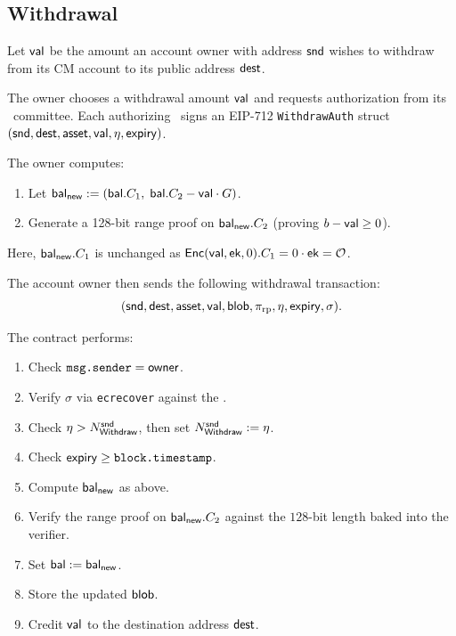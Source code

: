 \subsection{Withdrawal}
\label{sec:withdraw}
%
Let $\mathsf{val}$ be the amount an account owner with address ${\sf snd}$ wishes to withdraw from its CM account to its public address $\mathsf{dest}$.

\one
{}
The owner chooses a withdrawal amount $\mathsf{val}$ and requests authorization from its \CE\ committee.
Each authorizing \CE\ signs an EIP-712 \texttt{WithdrawAuth} struct $({\sf snd}, \mathsf{dest}, \mathsf{asset}, \mathsf{val}, \eta, \mathsf{expiry})$.

\one
{}
The owner computes:
%
\begin{enumerate}[itemsep=.5pt]
    \item Let $\mathsf{bal}_{\mathsf{new}} := (\mathsf{bal}.C_1,\; \mathsf{bal}.C_2 - \mathsf{val} \cdot G)$.
    \item Generate a 128-bit range proof on $\mathsf{bal}_{\mathsf{new}}.C_2$ (proving $b - \mathsf{val}\ge 0$).
\end{enumerate}
%
Here, $\mathsf{bal}_{\mathsf{new}}.C_1$ is unchanged  as ${\mathsf{Enc}}(\mathsf{val}, \textsf{ek}, 0).C_1 = 0 \cdot \textsf{ek} = \mathcal{O}$.

The account owner then sends the following withdrawal transaction:
%
\[
  ({\sf snd}, \mathsf{dest}, \mathsf{asset}, \mathsf{val}, \mathsf{blob}, \pi_{\rm rp}, \eta, \mathsf{expiry}, \sigma).
\]

\one
{}
The contract performs:
%
\begin{enumerate}[nosep]
  \item Check $\texttt{msg.sender} = \mathsf{owner}$.
  \item Verify $\sigma$ via \texttt{ecrecover} against the \CE.
  \item Check $\eta > N_\mathsf{Withdraw}^{\sf snd}$, then set $N_\mathsf{Withdraw}^{\sf snd} := \eta$.
  \item Check $\mathsf{expiry} \ge \texttt{block.timestamp}$.
  \item Compute $\mathsf{bal}_{\mathsf{new}}$ as above.
  \item Verify the range proof on $\mathsf{bal}_{\mathsf{new}}.C_2$ against the $128$-bit length baked into the verifier.
  \item Set $\mathsf{bal} := \mathsf{bal}_{\mathsf{new}}$.
  \item Store the updated $\mathsf{blob}$.
  \item Credit $\mathsf{val}$ to the destination address $\mathsf{dest}$.
\end{enumerate}
